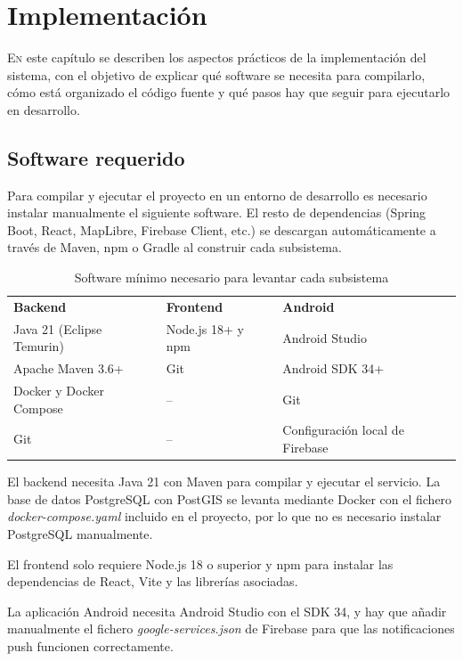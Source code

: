 \chapter{Implementación}
\label{chap:implementacion}

\lettrine{E}{n} este capítulo se describen los aspectos prácticos de la implementación del sistema, con el objetivo de explicar qué software se necesita para compilarlo, cómo está organizado el código fuente y qué pasos hay que seguir para ejecutarlo en desarrollo.

\section{Software requerido}

Para compilar y ejecutar el proyecto en un entorno de desarrollo es necesario instalar manualmente el siguiente software. El resto de dependencias (Spring Boot, React, MapLibre, Firebase Client, etc.) se descargan automáticamente a través de Maven, npm o Gradle al construir cada subsistema.

\begin{table}[H]
  \centering
  \begin{tabular}{p{}|p{}|p{}}
    \rowcolor{udcpink!25}
    \textbf{Backend} & \textbf{Frontend} & \textbf{Android} \\
    Java 21 (Eclipse Temurin) & Node.js 18+ y npm & Android Studio \\
    Apache Maven 3.6+ & Git & Android SDK 34+ \\
    Docker y Docker Compose & -- & Git \\
    Git & -- & Configuración local de Firebase \\
  \end{tabular}
  \caption{Software mínimo necesario para levantar cada subsistema}
  \label{tab:software-requerido}
\end{table}

El backend necesita Java 21 con Maven para compilar y ejecutar el servicio. La base de datos PostgreSQL con PostGIS se levanta mediante Docker con el fichero \textit{docker-compose.yaml} incluido en el proyecto, por lo que no es necesario instalar PostgreSQL manualmente.

El frontend solo requiere Node.js 18 o superior y npm para instalar las dependencias de React, Vite y las librerías asociadas.

La aplicación Android necesita Android Studio con el SDK 34, y hay que añadir manualmente el fichero \textit{google-services.json} de Firebase para que las notificaciones push funcionen correctamente.

